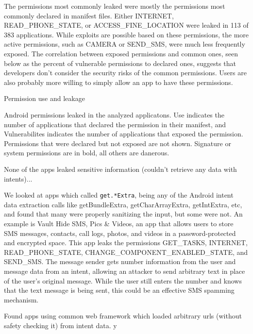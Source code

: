 \documentclass[12pt,a4paper]{article}
\begin{document}
The permissions most commonly leaked were mostly the permissions most commonly
declared in manifest files. Either INTERNET, READ\_PHONE\_STATE, or
ACCESS\_FINE\_LOCATION were leaked in 113 of 383 applications. While exploits
are possible based on these permissions, the more active permissions, such as
CAMERA or SEND\_SMS, were much less frequently exposed. The correlation between
exposed permissions and common ones, seen below as the percent of vulnerable
permissions to declared ones, suggests that developers don't consider the
security risks of the common permissions. Users are also probably more willing
to simply allow an app to have these permissions.
\begin{table}
\caption{Permission use and leakage}

\caption*{Android permissions leaked in the analyzed applicatons. Use indicates
  the number of applications that declared the permission in their
  manifest, and Vulnerabilites indicates the number of applications that
  exposed the permission.  Permissions that were declared but not exposed
  are not shown. Signature or system permissions are in bold, all others
  are danerous.}
\end{table}
None of the apps leaked sensitive information (couldn't retrieve any data with
intents)...

We looked at apps which called \texttt{get.*Extra}, being any of the Android
intent data extraction calls like getBundleExtra, getCharArrayExtra,
getIntExtra, etc, and found that many were properly sanitizing the input, but
some were not. An example is Vault Hide SMS, Pics \& Videos, an app that allows
users to store SMS messages, contacts, call logs, photos, and videos in a
password-protected and encrypted space. This app leaks the permissions
GET\_TASKS, INTERNET, READ\_PHONE\_STATE, CHANGE\_COMPONENT\_ENABLED\_STATE, and
SEND\_SMS. The message sender gets number information from the user and message
data from an intent, allowing an attacker to send arbitrary text in place of the
user's original message. While the user still enters the number and knows that
the text message is being sent, this could be an effective SMS spamming
mechanism.

Found apps using common web framework which loaded arbitrary urls (without
safety checking it) from intent data.  y
\end{document}
